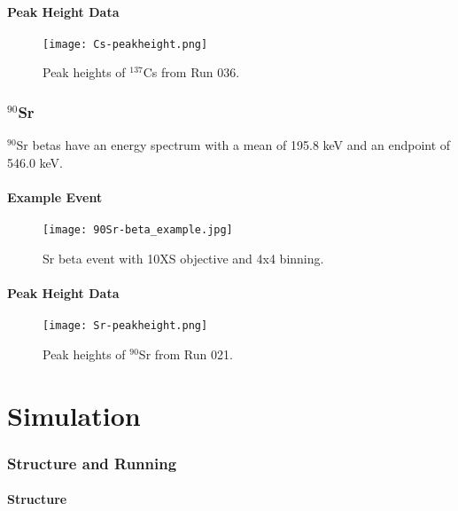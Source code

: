 \documentclass[a4paper,10pt]{article}
\begin{document}
\subsection{Peak Height Data}
\begin{figure}[!htbp]
	\centering
	\texttt{[image: Cs-peakheight.png]}
	\caption{Peak heights of $^{137}$Cs from Run 036.}
	\label{fig:Cs-peakheight}
\end{figure}

\section{$^{90}$Sr}

$^{90}$Sr betas have an energy spectrum with a mean of 195.8 keV and an endpoint of 546.0 keV.

\subsection{Example Event}
\begin{figure}[!htbp]
	\centering
	\texttt{[image: 90Sr-beta\_example.jpg]}
	\caption{Sr beta event with 10XS objective and 4x4 binning.}
	\label{fig:10XSSrbeta}
\end{figure}

\subsection{Peak Height Data}
\begin{figure}[!htbp]
	\centering
	\texttt{[image: Sr-peakheight.png]}
	\caption{Peak heights of $^{90}$Sr from Run 021.}
	\label{fig:Sr-peakheight}
\end{figure}


\part{Simulation}
\section{Structure and Running}

\subsection{Structure}
\end{document}

